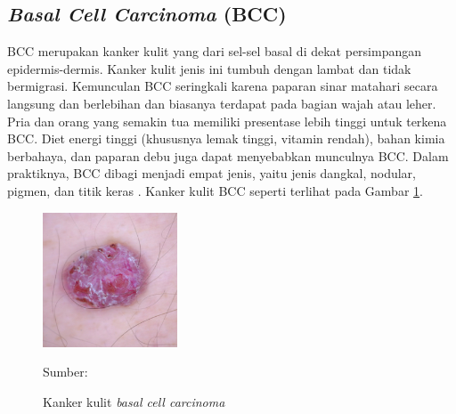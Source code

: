     \subsection{\textit{Basal Cell Carcinoma} (BCC)}
    BCC merupakan kanker kulit yang dari sel-sel basal di dekat persimpangan epidermis-dermis. Kanker kulit jenis ini tumbuh dengan lambat dan tidak bermigrasi. Kemunculan BCC seringkali karena paparan sinar matahari secara langsung dan berlebihan dan biasanya terdapat pada bagian wajah atau leher. Pria dan orang yang semakin tua memiliki presentase lebih tinggi untuk terkena BCC. Diet energi tinggi (khususnya lemak tinggi, vitamin rendah), bahan kimia berbahaya, dan paparan debu juga dapat menyebabkan munculnya BCC. Dalam praktiknya, BCC dibagi menjadi empat jenis, yaitu jenis dangkal, nodular, pigmen, dan titik keras \citep{Sang2019}. Kanker kulit BCC seperti terlihat pada Gambar \ref{fig:bcc}.
    \begin{figure}[H] 
        \begin{center} 
            \includegraphics[width=4cm]{../img/Skin Cancer BCC - Latex.jpg}
            \caption{Kanker kulit \textit{basal cell carcinoma}} 
            \label{fig:bcc}
            Sumber: \citep{Codella2018,Combalia2019,Tschandl2018}
        \end{center} 
    \end{figure}


